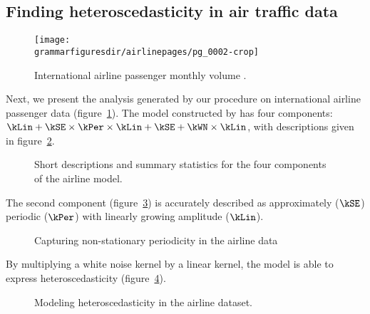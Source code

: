 \subsection{Finding heteroscedasticity in air traffic data}
\label{sec:airline}

\begin{figure}[h]
\centering
\texttt{[image: \\grammarfiguresdir/airlinepages/pg\_0002-crop]}
\caption[International airline passenger monthly volume dataset]
{International airline passenger monthly volume \citep[e.g.][]{box2013time}.}
\label{fig:airline}
\end{figure}

Next, we present the analysis generated by our procedure on international airline passenger data (figure~\ref{fig:airline}).
The model constructed by \procedurename{} has four components: $\kLin + \kSE \times \kPer \times \kLin + \kSE + \kWN \times \kLin$, with descriptions given in figure~\ref{fig:exec-airline}.

\begin{figure}[h]
\centering
{}
\caption[Short descriptions of the four components of the airline model]
{Short descriptions and summary statistics for the four components of the airline model.}
\label{fig:exec-airline}
\end{figure}

The second component (figure~\ref{fig:lin_periodic}) is accurately described as approximately ($\kSE$) periodic ($\kPer$) with linearly growing amplitude ($\kLin$).
%
\begin{figure}[h]
\centering
{}
\caption[Capturing non-stationary periodicity in the airline data]
{Capturing non-stationary periodicity in the airline data}
\label{fig:lin_periodic}
\end{figure}
%
By multiplying a white noise kernel by a linear kernel, the model is able to express heteroscedasticity (figure~\ref{fig:heteroscedastic}).
%
\begin{figure}[h]
\centering
{}
\caption[Modeling heteroscedasticity in the airline dataset]
{Modeling heteroscedasticity in the airline dataset.}
\label{fig:heteroscedastic}
\end{figure}

